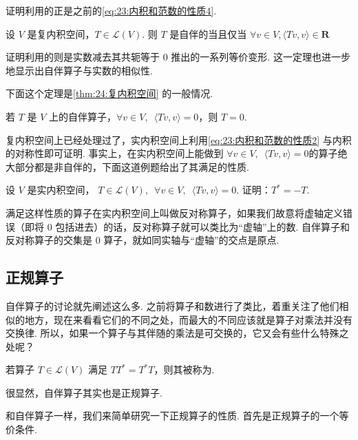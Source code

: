 证明利用的正是之前的\autoref{eq:23:内积和范数的性质4}.

\begin{theorem}
    设 $ V $ 是复内积空间，$ T \in \mathcal{L}(V) $. 则 $ T $ 是自伴的当且仅当 $ \forall v \in V, \langle Tv, v \rangle \in \mathbf{R} $
\end{theorem}

证明利用的则是实数减去其共轭等于 0 推出的一系列等价变形. 这一定理也进一步地显示出自伴算子与实数的相似性.

下面这个定理是\autoref{thm:24:复内积空间} 的一般情况.

\begin{theorem}
    若 $ T $ 是 $ V $ 上的自伴算子，$ \forall v \in V,\enspace \langle Tv, v \rangle = 0 $，则 $ T = 0 $.
\end{theorem}

复内积空间上已经处理过了，实内积空间上利用\autoref{eq:23:内积和范数的性质2} 与内积的对称性即可证明. 事实上，在实内积空间上能做到 $ \forall v \in V ,\enspace \langle Tv, v \rangle = 0 $的算子绝大部分都是非自伴的，下面这道例题给出了其满足的性质.

\begin{example}
    设 $ V $ 是实内积空间， $ T \in \mathcal{L}(V),\enspace \forall v \in V,\enspace \langle Tv, v \rangle = 0 $. 证明：$ T^* = -T $.
\end{example}

满足这样性质的算子在实内积空间上叫做反对称算子，如果我们故意将虚轴定义错误（即将 0 包括进去）的话，反对称算子就可以类比为``虚轴''上的数. 自伴算子和反对称算子的交集是 0 算子，就如同实轴与``虚轴''的交点是原点.

\subsection{正规算子}

自伴算子的讨论就先阐述这么多. 之前将算子和数进行了类比，着重关注了他们相似的地方，现在来看看它们的不同之处，而最大的不同应该就是算子对乘法并没有交换律. 所以，如果一个算子与其伴随的乘法是可交换的，它又会有些什么特殊之处呢？

\begin{definition}[正规算子]
    若算子 $ T \in \mathcal{L}(V) $ 满足 $ TT^* = T^*T $，则其被称为.
\end{definition}

很显然，自伴算子其实也是正规算子.

和自伴算子一样，我们来简单研究一下正规算子的性质. 首先是正规算子的一个等价条件.

